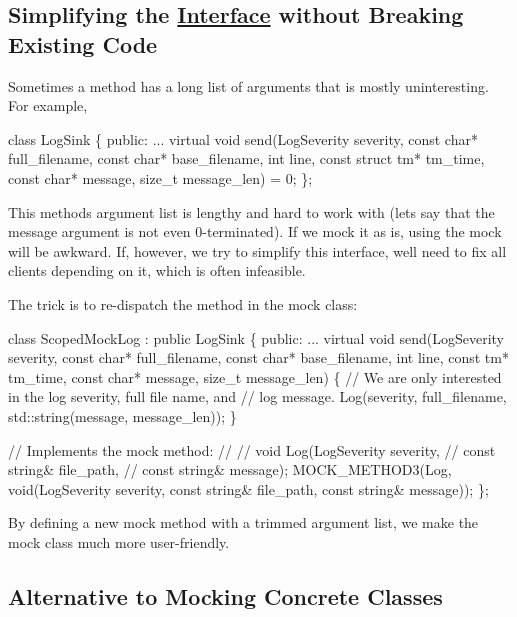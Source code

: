 \subsection*{Simplifying the \hyperlink{class_interface}{Interface} without Breaking Existing Code}

Sometimes a method has a long list of arguments that is mostly uninteresting. For example,


\begin{DoxyCode}
class LogSink \{
 public:
  ...
  virtual void send(LogSeverity severity, const char* full\_filename,
                    const char* base\_filename, int line,
                    const struct tm* tm\_time,
                    const char* message, size\_t message\_len) = 0;
\};
\end{DoxyCode}


This method\textquotesingle{}s argument list is lengthy and hard to work with (let\textquotesingle{}s say that the {\ttfamily message} argument is not even 0-\/terminated). If we mock it as is, using the mock will be awkward. If, however, we try to simplify this interface, we\textquotesingle{}ll need to fix all clients depending on it, which is often infeasible.

The trick is to re-\/dispatch the method in the mock class\+:


\begin{DoxyCode}
class ScopedMockLog : public LogSink \{
 public:
  ...
  virtual void send(LogSeverity severity, const char* full\_filename,
                    const char* base\_filename, int line, const tm* tm\_time,
                    const char* message, size\_t message\_len) \{
    // We are only interested in the log severity, full file name, and
    // log message.
    Log(severity, full\_filename, std::string(message, message\_len));
  \}

  // Implements the mock method:
  //
  //   void Log(LogSeverity severity,
  //            const string& file\_path,
  //            const string& message);
  MOCK\_METHOD3(Log, void(LogSeverity severity, const string& file\_path,
                         const string& message));
\};
\end{DoxyCode}


By defining a new mock method with a trimmed argument list, we make the mock class much more user-\/friendly.

\subsection*{Alternative to Mocking Concrete Classes}

